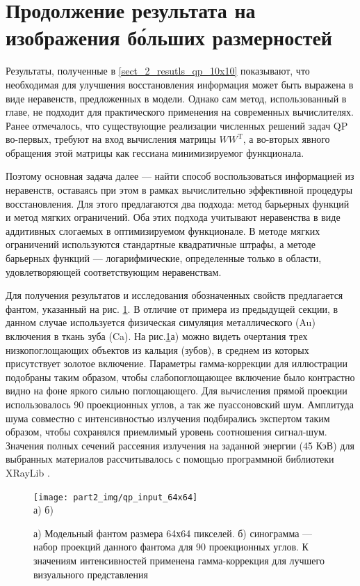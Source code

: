 \section{Продолжение результата на изображения б\'ольших размерностей}
Результаты, полученные в \ref{sect_2_resutls_qp_10x10} показывают, что необходимая для улучшения восстановления информация может быть выражена в виде неравенств, предложенных в модели.
Однако сам метод, использованный в главе, не подходит для практического применения на современных вычислителях.
Ранее отмечалось, что существующие реализации численных решений задач QP во-первых, требуют на вход вычисления матрицы $WW^{\mathrm T}$, а во-вторых явного обращения этой матрицы как гессиана минимизируемог функционала.

Поэтому основная задача далее --- найти способ воспользоваться информацией из неравенств, оставаясь при этом в рамках вычислительно эффективной процедуры восстановления.
Для этого предлагаются два подхода: метод барьерных функций и метод мягких ограничений. 
Оба этих подхода учитывают неравенства в виде аддитивных слогаемых в оптимизируемом функционале.
В методе мягких ограничений используются стандартные квадратичные штрафы, а методе барьерных функций --- логарифмические, определенные только в области, удовлетворяющей соответствующим неравенствам.

Для получения результатов и исследования обозначенных свойств предлагается фантом, указанный на рис. \ref{fig:qp_phantom_64by64}.
В отличие от примера из предыдущей секции, в данном случае используется физическая симуляция металлического (Au) включения в ткань зуба (Ca).
На рис.\ref{fig:qp_phantom_64by64}а) можно видеть очертания трех низкопоглощающих объектов из кальция (зубов), в среднем из которых присутствует золотое включение.
Параметры гамма-коррекции для иллюстрации подобраны таким образом, чтобы слабопоглощающее включение было контрастно видно на фоне яркого сильно поглощающего.
Для вычисления прямой проекции использовалось 90 проекционных углов, а так же пуассоновский шум.
Амплитуда шума совместно с интенсивностью излучения подбирались экспертом таким образом, чтобы сохранялся приемлимый уровень соотношения сигнал-шум.
Значения полных сечений рассеяния излучения на заданной энергии (45 КэВ) для выбранных материалов рассчитывалось с помощью программной библиотеки XRayLib \cite{xraylib}.

\begin{figure}
    \centering
    \texttt{[image: part2\_img/qp\_input\_64x64]} \\
    а) \hspace{0.5\textwidth} б)
    \caption{а) Модельный фантом размера 64х64 пикселей. б) синограмма --- набор проекций данного фантома для 90 проекционных углов. К значениям интенсивностей применена гамма-коррекция для лучшего визуального представления }
    \label{fig:qp_phantom_64by64}
\end{figure}

